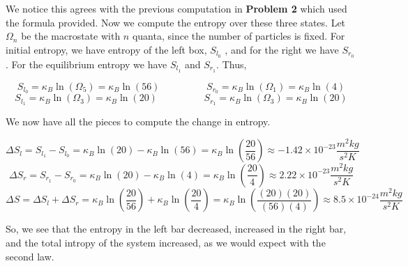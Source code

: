 \documentclass[10pt]{article}
\begin{document}
We notice this agrees with the previous computation in \textbf{Problem 2} which used the formula provided. Now we compute the entropy over these three states. Let $\Omega_{n}$ be the macrostate with $n$ quanta, since the number of particles is fixed. For initial entropy, we have entropy of the left box, $S_{l_{0}}$ , and for the right we have $S_{r_{0}}$. For the equilibrium entropy we have $S_{l_{1}}$ and $S_{r_{1}}$. Thus,

$$S_{l_{0}} = \kappa_{B}\ln(\Omega_{5}) = \kappa_{B}\ln(56) \hspace{2cm} S_{r_{0}} = \kappa_{B}\ln(\Omega_{1}) = \kappa_{B}\ln(4)$$
$$S_{l_{1}} = \kappa_{B}\ln(\Omega_{3}) = \kappa_{B}\ln(20) \hspace{2cm} S_{r_{1}} = \kappa_{B}\ln(\Omega_{3}) = \kappa_{B}\ln(20)$$

We now have all the pieces to compute the change in entropy.

$$\Delta S_{l} = S_{l_{1}} - S_{l_{0}} = \kappa_{B}\ln(20) - \kappa_{B}\ln(56) = \kappa_{B} \ln\left(\frac{20}{56}\right) \approx -1.42 \times 10^{-23} \frac{m^{2}kg}{s^{2}K}$$
$$\Delta S_{r} = S_{r_{1}} - S_{r_{0}} = \kappa_{B}\ln(20) - \kappa_{B}\ln(4) = \kappa_{B} \ln\left(\frac{20}{4}\right) \approx 2.22 \times 10^{-23} \frac{m^{2}kg}{s^{2}K}$$
$$\Delta S = \Delta S_{l} + \Delta S_{r} = \kappa_{B}\ln\left(\frac{20}{56}\right) + \kappa_{B}\ln\left(\frac{20}{4}\right) = \kappa_{B} \ln\left(\frac{(20)(20)}{(56)(4)}\right) \approx 8.5 \times 10^{-24} \frac{m^{2}kg}{s^{2}K}$$

So, we see that the entropy in the left bar decreased, increased in the right bar, and the total intropy of the system increased, as we would expect with the second law.
\end{document}
